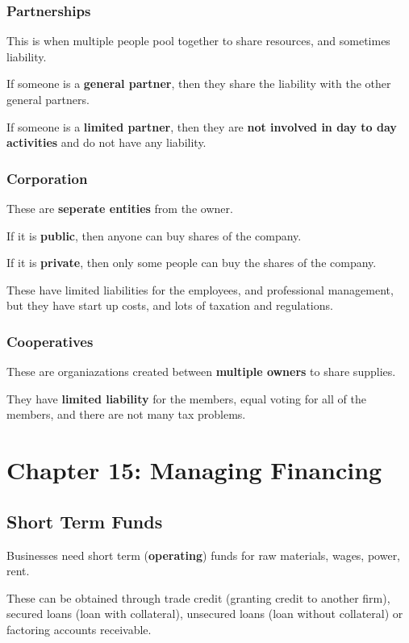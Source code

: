 \documentclass[12pt,letterpaper]{article} \usepackage{amsmath} \usepackage{graphicx} \usepackage[margin=1in]{geometry} \usepackage{longtable}  \usepackage{amssymb}
\begin{document}
		\subsubsection{Partnerships}
		This is when multiple people pool together to share resources, and sometimes liability.
		
		If someone is a \textbf{general partner}, then they share the liability with the other general partners. 
		
		If someone is a \textbf{limited partner}, then they are \textbf{not involved in day to day activities} and do not have any liability.
		
		\subsubsection{Corporation}
		These are \textbf{seperate entities} from the owner. 
		
		If it is \textbf{public}, then anyone can buy shares of the company.
		
		If it is \textbf{private}, then only some people can buy the shares of the company. 
		
		These have limited liabilities for the employees, and professional management, but they have start up costs, and lots of taxation and regulations. 
		
		\subsubsection{Cooperatives}
		These are organiazations created between \textbf{multiple owners} to share supplies. 
		
		They have \textbf{limited liability} for the members, equal voting for all of the members, and there are not many tax problems. 
		
		\section{Chapter 15: Managing Financing}
		\subsection{Short Term Funds}
		Businesses need short term (\textbf{operating}) funds for raw materials, wages, power, rent. 
		
		These can be obtained through trade credit (granting credit to another firm), secured loans (loan with collateral), unsecured loans (loan without collateral) or factoring accounts receivable. 
		
\end{document}
